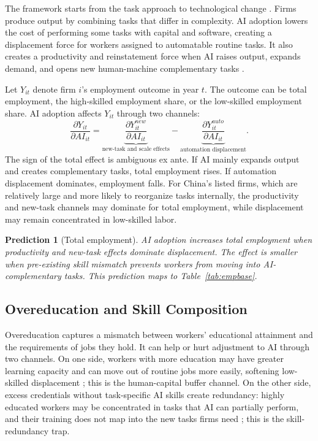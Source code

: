 \documentclass[12pt,a4paper]{article}
\theoremstyle{predstyle}
\newtheorem{prediction}{Prediction}
\theoremstyle{plain}
\begin{document}
The framework starts from the task approach to technological change \citep{autor2003skill, acemoglu2018artificial, acemoglu2022tasks}. Firms produce output by combining tasks that differ in complexity. AI adoption lowers the cost of performing some tasks with capital and software, creating a displacement force for workers assigned to automatable routine tasks. It also creates a productivity and reinstatement force when AI raises output, expands demand, and opens new human-machine complementary tasks \citep{aghion1992model, acemoglu2022tasks}.

Let \(Y_{it}\) denote firm \(i\)'s employment outcome in year \(t\). The outcome can be total employment, the high-skilled employment share, or the low-skilled employment share. AI adoption affects \(Y_{it}\) through two channels:
\[
\frac{\partial Y_{it}}{\partial AI_{it}}
= \underbrace{\frac{\partial Y_{it}^{new}}{\partial AI_{it}}}_{\text{new-task and scale effects}}
- \underbrace{\frac{\partial Y_{it}^{auto}}{\partial AI_{it}}}_{\text{automation displacement}}.
\]
The sign of the total effect is ambiguous ex ante. If AI mainly expands output and creates complementary tasks, total employment rises. If automation displacement dominates, employment falls. For China's listed firms, which are relatively large and more likely to reorganize tasks internally, the productivity and new-task channels may dominate for total employment, while displacement may remain concentrated in low-skilled labor.

\begin{prediction}[Total employment]
\label{pred:total}
AI adoption increases total employment when productivity and new-task effects dominate displacement. The effect is smaller when pre-existing skill mismatch prevents workers from moving into AI-complementary tasks. This prediction maps to Table~\ref{tab:empbase}.
\end{prediction}

\subsection{Overeducation and Skill Composition}

Overeducation captures a mismatch between workers' educational attainment and the requirements of jobs they hold. It can help or hurt adjustment to AI through two channels. On one side, workers with more education may have greater learning capacity and can move out of routine jobs more easily, softening low-skilled displacement \citep{becker1964human}; this is the human-capital buffer channel. On the other side, excess credentials without task-specific AI skills create redundancy: highly educated workers may be concentrated in tasks that AI can partially perform, and their training does not map into the new tasks firms need \citep{spence1973job}; this is the skill-redundancy trap.
\end{document}
